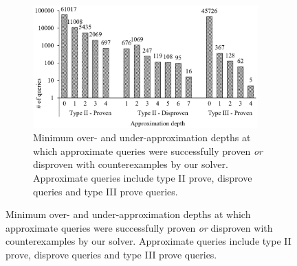 \begin{figure}
\begin{subfigure}[b]{0.43\textwidth}
\end{subfigure}%
\hfill
\begin{subfigure}[b]{0.55\textwidth}
\begin{center}
\includegraphics[width=0.95\textwidth]{chapters/figures/figQueryDepthDist.PNG}
\end{center}
\caption{\label{tab:querydepthdist}Minimum over- and under-approximation depths at which approximate queries were successfully proven {\em or} disproven with counterexamples by our solver.
Approximate queries include type II prove, disprove queries and type III prove queries.}
\end{subfigure}
\end{figure}

